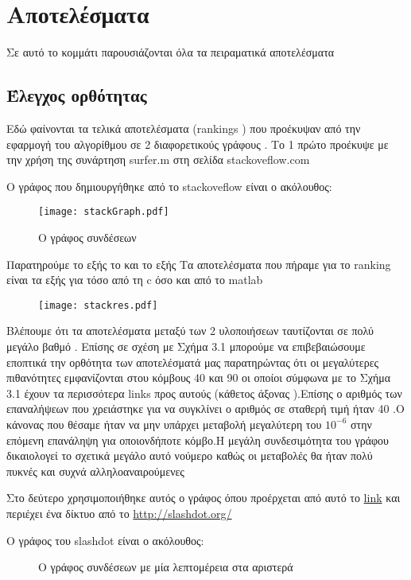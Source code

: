 \chapter{Αποτελέσματα}
Σε αυτό το κομμάτι παρουσιάζονται όλα τα πειραματικά αποτελέσματα 
\section{Έλεγχος ορθότητας}
Εδώ φαίνονται τα τελικά αποτελέσματα (rankings ) που προέκυψαν από την εφαρμογή του αλγορίθμου σε 2 διαφορετικούς γράφους .
Το 1 πρώτο προέκυψε με την χρήση της συνάρτηση surfer.m στη σελίδα stackoveflow.com
 
O γράφος που δημιουργήθηκε από το stackoveflow είναι ο ακόλουθος:
 \begin{figure}[h!]
 \centerline{\texttt{[image: stackGraph.pdf]}}
 \caption{Ο γράφος συνδέσεων}
 \end{figure}
 
 Παρατηρούμε το εξής το και το εξής
 \newpage
 Τα αποτελέσματα που πήραμε για το ranking είναι τα εξής για τόσο από τη c όσο και από το matlab
 \begin{figure}[h!]
 \centerline{\texttt{[image: stackres.pdf]}}
 \end{figure}
 
  Βλέπουμε ότι τα αποτελέσματα μεταξύ των 2 υλοποιήσεων  ταυτίζονται σε πολύ μεγάλο βαθμό .
  Επίσης σε σχέση  με Σχήμα 3.1  μπορούμε να επιβεβαιώσουμε  εποπτικά την ορθότητα των αποτελέσματά μας
  παρατηρώντας ότι οι μεγαλύτερες πιθανότητες εμφανίζονται  στου κόμβους 40 και 90 οι οποίοι  σύμφωνα με το Σχήμα 3.1 έχουν
  τα περισσότερα links προς αυτούς (κάθετος άξονας ).Επίσης ο αριθμός των επαναλήψεων που χρειάστηκε για να συγκλίνει ο αριθμός σε σταθερή τιμή ήταν 40 .Ο κάνονας που θέσαμε ήταν να μην υπάρχει μεταβολή μεγαλύτερη του $10^{-6}$ στην επόμενη επανάληψη για 
  οποιονδήποτε κόμβο.Η μεγάλη συνδεσιμότητα του γράφου δικαιολογεί το σχετικά μεγάλο αυτό νούμερο καθώς οι μεταβολές θα ήταν πολύ πυκνές και συχνά αλληλοαναιρούμενες 
 \newpage

 Στο δεύτερο χρησιμοποιήθηκε αυτός ο γράφος όπου προέρχεται από αυτό το
 \href {http://snap.stanford.edu/data/soc-Slashdot0811.html}{link}
και περιέχει ένα δίκτυο από το   \url{ http://slashdot.org/}
 
  O γράφος του slashdot είναι ο ακόλουθος:
 \begin{figure}[h!]
 \centering
 \caption{O γράφος συνδέσεων με μία λεπτομέρεια στα αριστερά}
 \end{figure}

